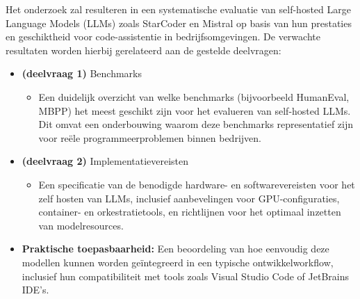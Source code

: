 Het onderzoek zal resulteren in een systematische evaluatie van self-hosted Large Language Models (LLMs) zoals StarCoder en Mistral op basis van hun prestaties en geschiktheid voor code-assistentie in bedrijfsomgevingen. De verwachte resultaten worden hierbij gerelateerd aan de gestelde deelvragen:
\begin{itemize}
    \item \textbf{(deelvraag 1)} Benchmarks
    \begin{itemize}
        \item Een duidelijk overzicht van welke benchmarks (bijvoorbeeld HumanEval, MBPP) het meest geschikt zijn voor het evalueren van self-hosted LLMs. Dit omvat een onderbouwing waarom deze benchmarks representatief zijn voor reële programmeerproblemen binnen bedrijven.
    \end{itemize}

    \item \textbf{(deelvraag 2)} Implementatievereisten
    \begin{itemize}
        \item Een specificatie van de benodigde hardware- en softwarevereisten voor het zelf hosten van LLMs, inclusief aanbevelingen voor GPU-configuraties, container- en orkestratietools, en richtlijnen voor het optimaal inzetten van modelresources.
    \end{itemize}

    \item \textbf{Praktische toepasbaarheid:} Een beoordeling van hoe eenvoudig deze modellen kunnen worden geïntegreerd in een typische ontwikkelworkflow, inclusief hun compatibiliteit met tools zoals Visual Studio Code of JetBrains IDE's.


\end{itemize}
